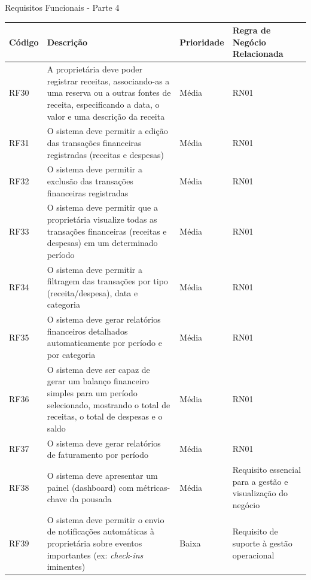 \documentclass[
	12pt,				%
	openany,			%
	oneside,			%
	a4paper,			%
	english,			%
	french,				%
	spanish,			%
	brazil				%
	]{abntex2}
\begin{document}
\begin{apendicesenv}
\begin{quadro}[H]
	\caption{Requisitos Funcionais - Parte 4}
	\label{quadro_rfc4}
	\begin{tabular}{|>{\centering\arraybackslash}p{1.5cm}|p{6.7cm}|>{\centering\arraybackslash}p{2cm}|>{\centering\arraybackslash}p{4cm}|}
		\hline
		\textbf{Código} & \textbf{Descrição} & \textbf{Prioridade} & \textbf{Regra de Negócio Relacionada} \\ \hline
		RF30 & A proprietária deve poder registrar receitas, associando-as a uma reserva ou a outras fontes de receita, especificando a data, o valor e uma descrição da receita & Média & RN01
		 \\ \hline
		RF31 & O sistema deve permitir a edição das transações financeiras registradas (receitas e despesas) & Média & RN01 
		\\ \hline
		RF32 & O sistema deve permitir a exclusão das transações financeiras registradas & Média & RN01
		 \\ \hline
		RF33 & O sistema deve permitir que a proprietária visualize todas as transações financeiras (receitas e despesas) em um determinado período & Média & RN01 
		\\ \hline
		RF34 & O sistema deve permitir a filtragem das transações por tipo (receita/despesa), data e categoria & Média & RN01
		 \\ \hline
		RF35 & O sistema deve gerar relatórios financeiros detalhados automaticamente por período e por categoria & Média & RN01
		\\ \hline
		RF36 & O sistema deve ser capaz de gerar um balanço financeiro simples para um período selecionado, mostrando o total de receitas, o total de despesas e o saldo & Média & RN01
		\\ \hline
		RF37 & O sistema deve gerar relatórios de faturamento por período & Média & RN01
		\\ \hline
		RF38 & O sistema deve apresentar um painel (dashboard) com métricas-chave da pousada & Média & Requisito essencial para a gestão e visualização do negócio 
		\\ \hline
		RF39 & O sistema deve permitir o envio de notificações automáticas à proprietária sobre eventos importantes (ex: \textit{check-ins} iminentes)
		& Baixa & Requisito de suporte à gestão operacional \\ \hline
	\end{tabular}
\end{quadro}
%
\end{apendicesenv}
\end{document}
